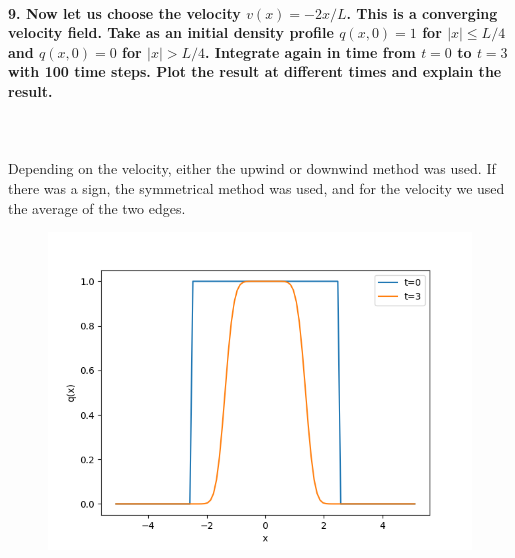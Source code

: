 \paragraph{9. Now let us choose the velocity $v(x)=-2x/L$. 
    This is a converging velocity field. Take as an initial 
    density profile $q(x, 0)=1$ for $|x|\le L/4$ and 
    $q(x,0)=0$ for $|x|>L/4$. Integrate again in time from 
    $t=0$ to $t=3$ with 100 time steps. Plot the result at 
    different times and explain the result.
} \ \\
    \\
    Depending on the velocity, either the upwind 
    or downwind method was used. If there was a 
    sign, the symmetrical method was used, and 
    for the velocity we used the average of the 
    two edges.
    \begin{figure}[h!]
        \centering
        \includegraphics[width=.7\textwidth]{../figures/plot2.png}
    \end{figure} \ \\ 
